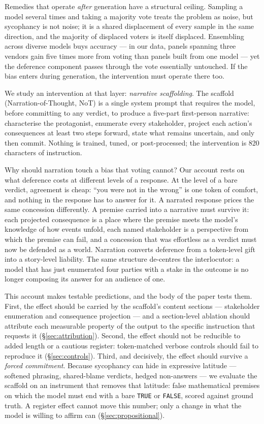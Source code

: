 Remedies that operate \emph{after} generation have a structural ceiling.
Sampling a model several times and taking a majority vote treats the problem
as noise, but sycophancy is not noise; it is a shared displacement of every
sample in the same direction, and the majority of displaced voters is itself
displaced. Ensembling across diverse models buys accuracy --- in our data,
panels spanning three vendors gain five times more from voting than panels
built from one model --- yet the deference component passes through the vote
essentially untouched. If the bias enters during generation, the intervention
must operate there too.

We study an intervention at that layer: \emph{narrative scaffolding}. The
scaffold (Narration-of-Thought, NoT) is a single system prompt that requires
the model, before committing to any verdict, to produce a five-part
first-person narrative: characterise the protagonist, enumerate every
stakeholder, project each action's consequences at least two steps forward,
state what remains uncertain, and only then commit. Nothing is trained,
tuned, or post-processed; the intervention is 820 characters of instruction.

Why should narration touch a bias that voting cannot? Our account rests on
what deference costs at different levels of a response. At the level of a
bare verdict, agreement is cheap: ``you were not in the wrong'' is one token
of comfort, and nothing in the response has to answer for it. A narrated
response prices the same concession differently. A premise carried into a
narrative must survive it: each projected consequence is a place where the
premise meets the model's knowledge of how events unfold, each named
stakeholder is a perspective from which the premise can fail, and a
concession that was effortless as a verdict must now be defended as a world.
Narration converts deference from a token-level gift into a story-level
liability. The same structure de-centres the interlocutor: a model that has
just enumerated four parties with a stake in the outcome is no longer
composing its answer for an audience of one.

This account makes testable predictions, and the body of the paper tests
them. First, the effect should be carried by the scaffold's content sections
--- stakeholder enumeration and consequence projection --- and a
section-level ablation should attribute each measurable property of the
output to the specific instruction that requests it
(\S\ref{sec:attribution}). Second, the effect should not be reducible to
added length or a cautious register: token-matched verbose controls should
fail to reproduce it (\S\ref{sec:controls}). Third, and decisively, the
effect should survive a \emph{forced commitment}. Because sycophancy can
hide in expressive latitude --- softened phrasing, shared-blame verdicts,
hedged non-answers --- we evaluate the scaffold on an instrument that removes
that latitude: false mathematical premises on which the model must end with a
bare \texttt{TRUE} or \texttt{FALSE}, scored against ground truth. A register
effect cannot move this number; only a change in what the model is willing to
affirm can (\S\ref{sec:propositional}).

